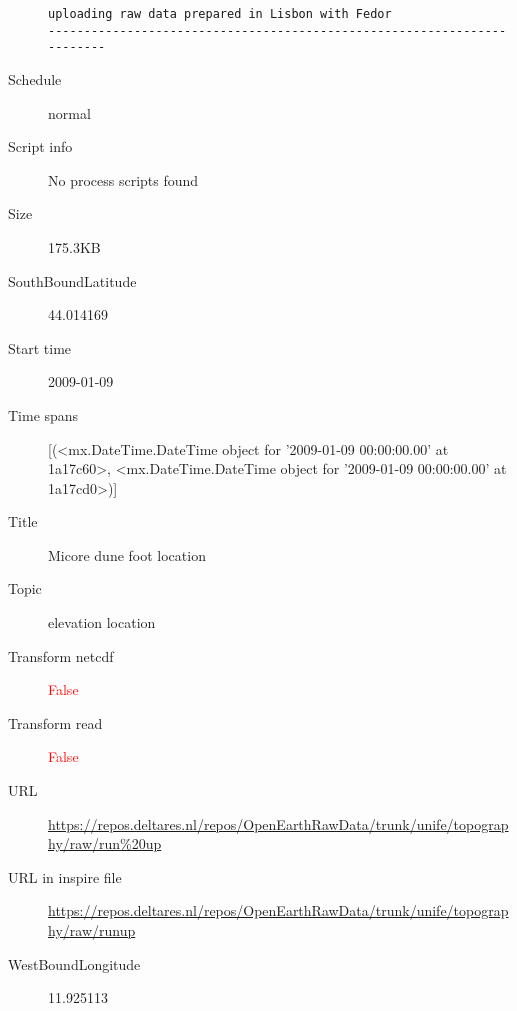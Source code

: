 \documentclass[9]{report}
\begin{document}
\begin{description}
\begin{verbatim}
uploading raw data prepared in Lisbon with Fedor
------------------------------------------------------------------------

\end{verbatim}
  \item[Schedule] normal
  \item[Script info] No process scripts found
  \item[Size] 175.3KB
  \item[SouthBoundLatitude] 44.014169
  \item[Start time] 2009-01-09
  \item[Time spans] [(<mx.DateTime.DateTime object for '2009-01-09 00:00:00.00' at 1a17c60>, <mx.DateTime.DateTime object for '2009-01-09 00:00:00.00' at 1a17cd0>)]
  \item[Title]  Micore dune foot location 
  \item[Topic] elevation location
  \item[Transform netcdf] \textcolor{red}{False}
  \item[Transform read] \textcolor{red}{False}
  \item[URL] \href{https://repos.deltares.nl/repos/OpenEarthRawData/trunk/unife/topography/raw/run\%20up}{https://repos.deltares.nl/repos/OpenEarthRawData/trunk/unife/topography/raw/run\%20up}
  \item[URL in inspire file] \href{https://repos.deltares.nl/repos/OpenEarthRawData/trunk/unife/topography/raw/runup}{https://repos.deltares.nl/repos/OpenEarthRawData/trunk/unife/topography/raw/runup}
  \item[WestBoundLongitude] 11.925113
\end{description}
\end{document}
